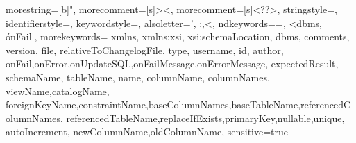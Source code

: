 

\newcommand{\functionDefHighlight}[1]{
\bfseries\textcolor{blue}{>} 
}


{
  morestring=[b]",
 morecomment=[s]{>}{<},
  morecomment=[s]{<?}{?>},
  stringstyle=\color{crimsonred},
  identifierstyle=\color{blue},
  keywordstyle=\color{cyan},
 alsoletter={', :,<},
  ndkeywords={=, <dbms, \'onFail\'},
  morekeywords={
  xmlns, 
  xmlns:xsi,
  xsi:schemaLocation,
  dbms, 
  comments,
  version, 
  file,
  relativeToChangelogFile, 
  type, 
  username,
  id,
  author, onFail,onError,onUpdateSQL,onFailMessage,onErrorMessage, expectedResult, schemaName, tableName, name, columnName, columnNames, viewName,catalogName, foreignKeyName,constraintName,baseColumnNames,baseTableName,referencedColumnNames, referencedTableName,replaceIfExists,primaryKey,nullable,unique, autoIncrement, newColumnName,oldColumnName},
  sensitive=true
}